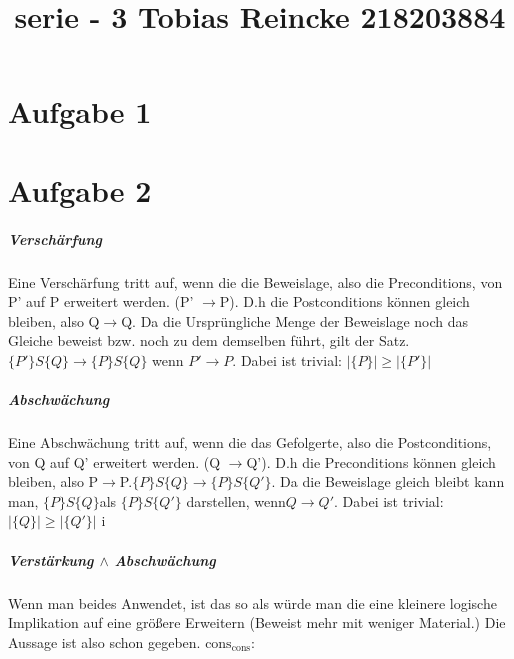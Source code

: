 \documentclass[10pt,a4paper]{article}
\title{serie - 3  Tobias Reincke 218203884}
\begin{document}
\section{Aufgabe 1}


\section{Aufgabe 2}
 \subparagraph{Verschärfung}
 Eine Verschärfung tritt auf, wenn die die Beweislage, also die Preconditions, von P' auf P erweitert werden. (P' $\rightarrow$P). D.h die  Postconditions können gleich bleiben, also Q$\rightarrow$Q. Da die Ursprüngliche Menge der Beweislage noch das Gleiche beweist bzw. noch zu dem demselben führt, gilt der Satz. $\{P'\} S  \{Q\} \rightarrow \{P\} S\{Q\} $ wenn $P'\rightarrow P$. Dabei ist trivial: $|\{P\}|\geq|\{P' \}|$

 \subparagraph{Abschwächung} 
  Eine Abschwächung tritt auf, wenn die das Gefolgerte, also die Postconditions, von Q auf Q' erweitert werden. (Q $\rightarrow$Q'). D.h die  Preconditions können gleich bleiben, also P$\rightarrow$P.$\{P\} S  \{Q\} \rightarrow \{P\} S \{Q'\} $. Da die Beweislage gleich bleibt kann man, $\{P\} S  \{Q\} $als $ \{P\} S \{Q'\} $ darstellen, wenn$Q \rightarrow Q' $. Dabei ist trivial: $|\{Q\}|\geq|\{Q'\}|$
i\subparagraph{Verstärkung $\wedge$ Abschwächung}
Wenn man beides Anwendet, ist das so als würde man die eine kleinere  logische Implikation auf eine größere Erweitern (Beweist mehr mit weniger Material.) Die Aussage ist  also schon gegeben.
$\text{cons}_\text{cons}$:





	
	
\end{document}
